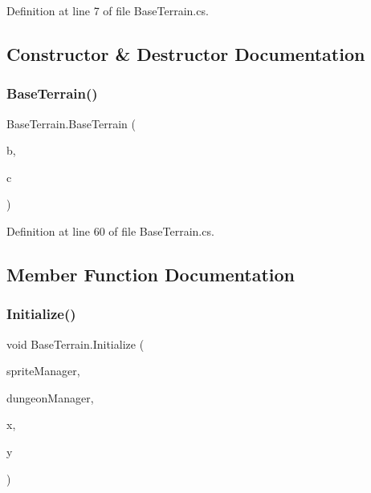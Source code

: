 Definition at line 7 of file Base\+Terrain.\+cs.



\subsection{Constructor \& Destructor Documentation}
\mbox{\label{class_base_terrain_a148b6e7aa268ebec1ab02c5e9f01f92d}} 
\subsubsection{\texorpdfstring{BaseTerrain()}{BaseTerrain()}}
{\footnotesize\ttfamily Base\+Terrain.\+Base\+Terrain (\begin{DoxyParamCaption}\item[{\mbox{\hyperlink{class_biome}{Biome}}}]{b,  }\item[{string}]{c }\end{DoxyParamCaption})}



Definition at line 60 of file Base\+Terrain.\+cs.



\subsection{Member Function Documentation}
\mbox{\label{class_base_terrain_aff9e343986e2b76d0fc22be3a5e246dc}} 
\subsubsection{\texorpdfstring{Initialize()}{Initialize()}}
{\footnotesize\ttfamily void Base\+Terrain.\+Initialize (\begin{DoxyParamCaption}\item[{\mbox{\hyperlink{class_sprite_manager}{Sprite\+Manager}}}]{sprite\+Manager,  }\item[{\mbox{\hyperlink{class_dungeon_manager}{Dungeon\+Manager}}}]{dungeon\+Manager,  }\item[{int}]{x,  }\item[{int}]{y }\end{DoxyParamCaption})}



